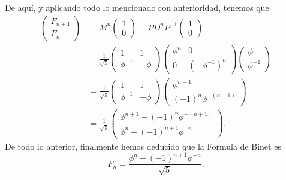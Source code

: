 De aquí, y aplicando todo lo mencionado con anterioridad, tenemos que
\begin{align*}
  \begin{pmatrix} F_{n+1} \\ F_n \end{pmatrix}
    &= M^n \begin{pmatrix} 1 \\ 0 \end{pmatrix}  = P D^n P^{-1} \begin{pmatrix} 1 \\ 0 \end{pmatrix} \\
    &= \frac{1}{\sqrt{5}} \begin{pmatrix} 1 & 1 \\ \phi^{-1} & -\phi \end{pmatrix}
        \begin{pmatrix} \phi^n & 0 \\ 0 & (-\phi^{-1})^n \end{pmatrix}
        \begin{pmatrix} \phi \\ \phi^{-1} \end{pmatrix} \\
    &= \frac{1}{\sqrt{5}} \begin{pmatrix} 1 & 1 \\ \phi^{-1} & -\phi \end{pmatrix}
        \begin{pmatrix} \phi^{n+1} \\ (-1)^n \phi^{-(n+1)} \end{pmatrix} \\
    &= \frac{1}{\sqrt{5}} \begin{pmatrix}
          \phi^{n+1} + (-1)^n \phi^{-(n+1)} \\
          \phi^n + (-1)^{n+1} \phi^{-n}
        \end{pmatrix}.
\end{align*}
De todo lo anterior, finalmente hemos deducido que la Formula de Binet es
\[
  F_n = \frac{\phi^n + (-1)^{n+1} \phi^{-n} }{\sqrt{5}}.
\]